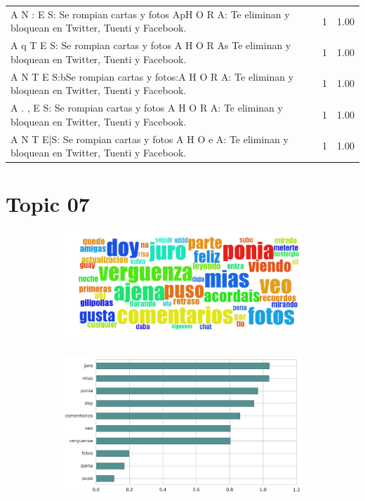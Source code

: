 \begin{longtable}{p{12.5cm}rr}
A N : E S: Se rompian cartas y fotos ApH O R A: Te eliminan y bloquean en Twitter, Tuenti y Facebook. & 1 & 1.00 \\
A q T E S: Se rompian cartas y fotos A H O R As Te eliminan y bloquean en Twitter, Tuenti y Facebook. & 1 & 1.00 \\
A N T E S:bSe rompian cartas y fotos:A H O R A: Te eliminan y bloquean en Twitter, Tuenti y Facebook. & 1 & 1.00 \\
A . , E S: Se rompian cartas y fotos A H O R A: Te eliminan y bloquean en Twitter, Tuenti y Facebook. & 1 & 1.00 \\
A N T E|S: Se rompian cartas y fotos A H O e A: Te eliminan y bloquean en Twitter, Tuenti y Facebook. & 1 & 1.00 \\

\end{longtable}
\clearpage

\section{Topic 07}

\begin{figure}[htbp!]
    \centering
    \begin{subfigure}[b]{0.49\textwidth}
        \includegraphics[width=\textwidth]{twitter_all/report_images/topic-07-wordcloud.jpg}
    \end{subfigure}
    \begin{subfigure}[b]{0.49\textwidth}
        \includegraphics[width=\textwidth]{twitter_all/report_images/topic-07-terms.jpg}
    \end{subfigure}
\end{figure}

